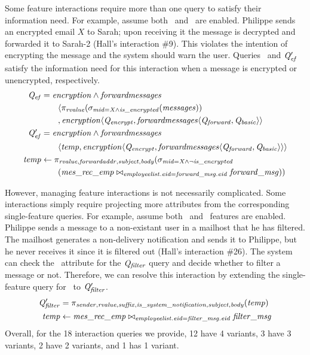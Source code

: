 %
Some feature interactions require more than one query to satisfy their
information need.
For example, assume both \encryption\ and \forwardmessages\ are enabled.
Philippe sends an encrypted email $X$ to Sarah; upon receiving it the message
is decrypted and forwarded it to Sarah-2 (Hall's interaction \#9). This
violates the intention of encrypting the message and the system should warn the
user.
%
Queries \Qef\ and $\Qef'$ satisfy the information need for this interaction
when a message is encrypted or unencrypted, respectively.
%
\begin{align*}
\Qef &= \encryption\wedge\forwardmessages \\
  &\qquad\langle
    \projectRel{\rvalue}{(\selectRel{\midCond\wedge\isencrypted}{(\messages)})}\\
&    \qquad,
    \encryption\langle\Qencrypt, 
 \chc[\forwardmessages]{\Qforward,\Qbasic} \rangle \\
\OB{\Qef'} &= \encryption\wedge\forwardmessages\\
&\qquad  \langle \temp, \encryption \langle \Qencrypt, 
 \chc[\forwardmessages]{\Qforward,\Qbasic} \rangle \rangle \\
\temp &\leftarrow
  \pi_{\rvalue,\forwardaddr,\subject,\body} (\sigma_{\midCond \wedge \neg\isencrypted} \\
  &\qquad (\mretable \bowtie_{\employees.\eid = \forwardmsg.\eid} \forwardmsg))
\end{align*}

\noindent
%
However, managing feature interactions is not necessarily complicated. Some
interactions simply require projecting more attributes from the corresponding
single-feature queries. For example, assume both \filtermessages\ and
\mailhost\ features are enabled. Philippe sends a message to a non-existant
user in a mailhost that he has filtered. The mailhost generates a non-delivery
notification and sends it to Philippe, but he never receives it since it is filtered out
(Hall's interaction \#26). The system can check the \issystemnotification\
attribute for the $\Qfilter$ query and decide whether to filter a message or
not. Therefore, we can resolve this interaction by extending the single-feature
query for \filtermessages\ to $\Qfilter'$.
%
\begin{align*}
\small
\OB{\Qfilter'} &= 
\projectRel {\sender, \rvalue, \suffix, \issystemnotification, \subject, \body} {(\temp)}\\
\temp &\leftarrow 
{\joinRel \mretable
\filtermsg
{\employees . \eid = \filtermsg . \eid }
}
\end{align*}
\noindent
%
Overall, for the 18 interaction queries we provide, 12 have 4 variants, 3 have
3 variants, 2 have 2 variants, and 1 has 1 variant.

